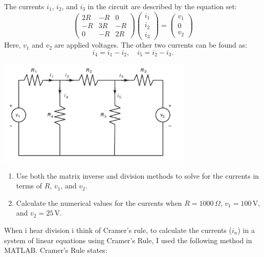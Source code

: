 \documentclass[a4paper, 12pt]{report}
\def\ni{green!60!black!40!white}
\begin{document}
\begin{tcolorbox}[title={\color{black}\section{Q4}}, colback=white, colframe=\ni, boxrule=1mm, width=1\textwidth]\centering
    The currents \({i_1}\), \({i_2}\), and \({i_3}\) in the circuit are described by the equation set:
    \[\begin{pmatrix}
        2R & -R & 0 \\
        -R & 3R & -R \\
        0 & -R & 2R
    \end{pmatrix}
    \begin{pmatrix}
        i_1 \\ i_2 \\ i_3
    \end{pmatrix}
    =
    \begin{pmatrix}
        v_1 \\ 0 \\ v_2
    \end{pmatrix}\]
    Here, \(v_1\) and \(v_2\) are applied voltages. The other two currents can be found as:
    \[i_4 = i_1 - i_2, \quad i_5 = i_2 - i_3.\]
    \begin{center}
        \hspace{0.4em}\includegraphics[width=0.7\textwidth]{main/graphs_images/4q.png}
    \end{center}
    \begin{enumerate}
        \item Use both the matrix inverse and division methods to solve for the currents in terms of \(R\), \(v_1\), and \(v_2\).
        \item Calculate the numerical values for the currents when \(R = 1000 \, \Omega\), \(v_1 = 100 \, \text{V}\), and \(v_2 = 25 \, \text{V}\).
    \end{enumerate}
\end{tcolorbox}
\raggedright
When i hear division i think of Cramer's rule, to calculate the currents (\(i_n\)) in a system of linear equations using Cramer's Rule, I used the following method in MATLAB. Cramer's Rule states:
\end{document}
